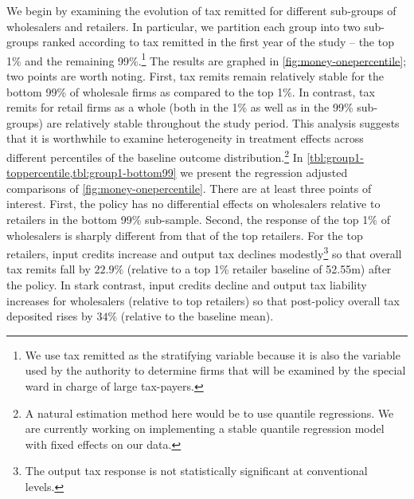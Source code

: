 We begin by examining the evolution of tax remitted for different sub-groups of wholesalers and retailers. In particular, we partition each group into two sub-groups ranked according to tax remitted in the first year of the study -- the top 1\% and the remaining 99\%.\footnote{We use tax remitted as the stratifying variable because it is also the variable used by the authority to determine firms that will be examined by the special ward in charge of large tax-payers.} The results are graphed in \cref{fig:money-onepercentile}; two points are worth noting. First, tax remits remain relatively stable for the bottom 99\% of wholesale firms as compared to the top 1\%. In contrast, tax remits for retail firms as a whole (both in the 1\% as well as in the 99\% sub-groups) are relatively stable throughout the study period. This analysis suggests that it is worthwhile to examine heterogeneity in treatment effects across different percentiles of the baseline outcome distribution.\footnote{A natural estimation method here would be to use quantile regressions. We are currently working on implementing a stable quantile regression model with fixed effects on our data.} In \cref{tbl:group1-toppercentile,tbl:group1-bottom99} we present the regression adjusted comparisons of \cref{fig:money-onepercentile}. There are at least three points of interest. First, the policy has no differential effects on wholesalers relative to retailers in the bottom 99\% sub-sample. Second, the response of the top 1\% of wholesalers is sharply different from that of the top retailers. For the top retailers, input credits increase and output tax declines modestly\footnote{The output tax response is not statistically significant at conventional levels.} so that overall tax remits fall by $22.9\%$ (relative to a top 1\% retailer baseline of \rupee 52.55m) after the policy. In stark contrast, input credits decline and output tax liability increases for wholesalers (relative to top retailers) so that post-policy overall tax deposited rises by $34\%$ (relative to the baseline mean).

